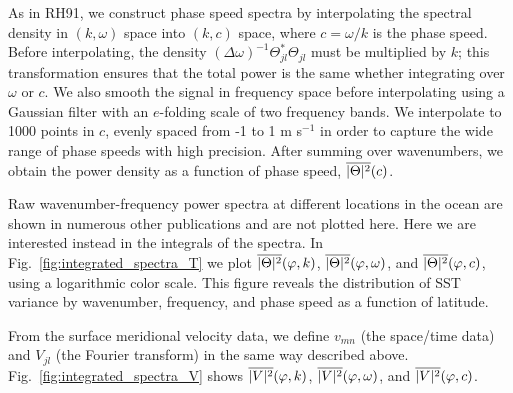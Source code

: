 \documentclass[10pt]{article}
\newcommand{\ol}{\ensuremath{\overline}}
\begin{document}
As in RH91, we construct phase speed spectra by interpolating the spectral density in $(k, \omega)$ space into $(k, c)$ space, where $c = \omega / k$ is the phase speed. Before interpolating, the density $(\Delta \omega)^{-1}\Theta_{jl}^\ast   \Theta_{jl}$ must be multiplied by $k$; this transformation ensures that the total power is the same whether integrating over $\omega$ or $c$. We also smooth the signal in frequency space before interpolating using a Gaussian filter with an $e$-folding scale of two frequency bands. We interpolate to 1000 points in $c$, evenly spaced from -1 to 1 m s$^{-1}$ in order to capture the wide range of phase speeds with high precision. After summing over wavenumbers, we obtain the power density as a function of phase speed, $\ol{|\Theta|^2}(c)$.

Raw wavenumber-frequency power spectra at different locations in the ocean are shown in numerous other publications \citep[e.g.][]{KillworthEtAl1997,Wunsch2010,WorthamWunsch2014} and are not plotted here. Here we are interested instead in the integrals of the spectra. In Fig.~\ref{fig:integrated_spectra_T} we plot $\ol{|\Theta|^2}(\varphi, k)$, $\ol{|\Theta|^2}(\varphi, \omega)$, and $\ol{|\Theta|^2}(\varphi, c)$, using a logarithmic color scale. This figure reveals the distribution of SST variance by wavenumber, frequency, and phase speed as a function of latitude.

From the surface meridional velocity data, we define $v_{mn}$ (the space/time data) and $V_{jl}$ (the Fourier transform) in the same way described above. Fig.~\ref{fig:integrated_spectra_V} shows
$\ol{|V|^2}(\varphi, k)$, $\ol{|V|^2}(\varphi, \omega)$, and $\ol{|V|^2}(\varphi, c)$. 
\end{document}

